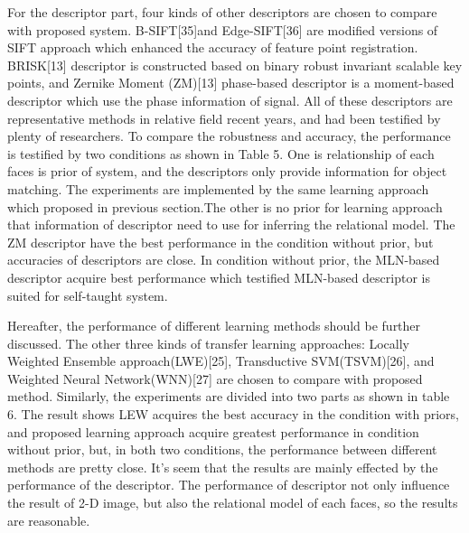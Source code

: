 \documentclass[journal]{IEEEtran}
\begin{document}
For the descriptor part, four kinds of other descriptors are chosen to compare with proposed system. B-SIFT[35]and Edge-SIFT[36] are modified versions of SIFT approach which enhanced the accuracy of feature point registration. BRISK[13] descriptor is constructed based on binary robust invariant scalable key points, and Zernike Moment (ZM)[13] phase-based descriptor is a moment-based descriptor which use the phase information of signal. All of these descriptors are representative methods in relative field recent years, and had been testified by plenty of researchers. To compare the robustness and accuracy, the performance is testified by two conditions as shown in Table 5. One is relationship of each faces is prior of system, and the descriptors only provide information for object matching. The experiments are implemented by the same learning approach which proposed in previous section.The other is no prior for learning approach that information of descriptor need to use for inferring the relational model. The ZM descriptor have the best performance in the condition without prior, but accuracies of descriptors are close. In condition without prior, the MLN-based descriptor acquire best performance which testified MLN-based descriptor is suited for self-taught system. 

Hereafter, the performance of different learning methods should be further discussed. The other three kinds of transfer learning approaches: Locally Weighted Ensemble approach(LWE)[25], Transductive SVM(TSVM)[26], and Weighted Neural Network(WNN)[27] are chosen to compare with proposed method. Similarly, the experiments are divided into two parts as shown in table 6. The result shows LEW acquires the best accuracy in the condition with priors, and proposed learning approach acquire greatest performance in condition without prior, but, in both two conditions, the performance between different methods are pretty close. It's seem that the results are mainly effected by the performance of the descriptor. The performance of descriptor not only influence the result of 2-D image, but also the relational model of each faces, so the results are reasonable. 

\newcommand{\tabincell}[2]{\begin{tabular}{@{}#1@{}}#2\end{tabular}}
\end{document}
